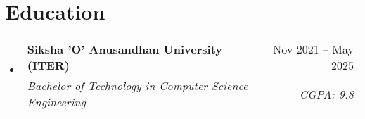 
\newcommand{\resumeItem}[1]{
  \item\small{
    {#1 \vspace{-2pt}}
  }
}

\newcommand{\resumeSubheading}[4]{
  \vspace{2pt}\item
  \begin{tabular*}{0.97\textwidth}[t]{l@{\extracolsep{\fill}}r}
    \textbf{#1} & #2 \\
    \textit{\small#3} & \textit{\small #4} \\
  \end{tabular*}\vspace{-5pt}
}

\newcommand{\resumeSubSubheading}[2]{
  \item
  \begin{tabular*}{0.97\textwidth}{l@{\extracolsep{\fill}}r}
    \textit{\small#1} & \textit{\small #2} \\
  \end{tabular*}\vspace{-7pt}
}

\newcommand{\resumeProjectHeading}[2]{
  \item
  \begin{tabular*}{0.97\textwidth}{l@{\extracolsep{\fill}}r}
    \small#1 & #2 \\
  \end{tabular*}\vspace{-5pt}
}

\newcommand{\resumeSubItem}[1]{\resumeItem{#1}\vspace{-4pt}}

\renewcommand\labelitemii{$\vcenter{\hbox{\tiny$\bullet$}}$}

\newcommand{\resumeSubHeadingListStart}{\begin{itemize}[leftmargin=0.15in, label={}]}
    \newcommand{\resumeSubHeadingListEnd}{\vspace{-10pt}\end{itemize}}
\newcommand{\resumeItemListStart}{\begin{itemize}}
    \newcommand{\resumeItemListEnd}{\end{itemize}\vspace{0pt}}

\section{Education}
\resumeSubHeadingListStart
\resumeSubheading
{Siksha 'O' Anusandhan University (ITER)}{Nov 2021 -- May 2025}
{Bachelor of Technology in Computer Science Engineering}{ CGPA: 9.8 }
\resumeSubHeadingListEnd


